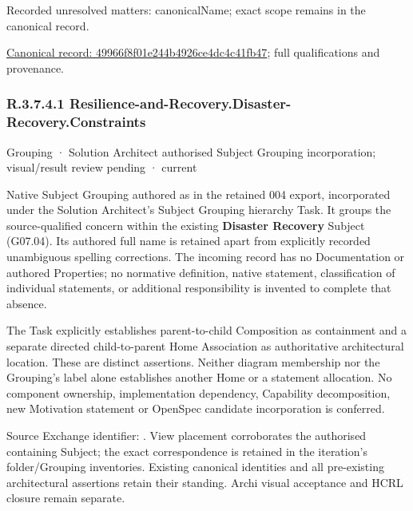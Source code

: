 {\small Recorded unresolved matters: canonicalName; exact scope remains in the canonical record.}\par
{\footnotesize \href{../../../../continuum/grouping/49966f8f01e244b4926ce4dc4c41fb47.md}{Canonical record: 49966f8f01e244b4926ce4dc4c41fb47}; full qualifications and provenance.}\par
\subsubsection*{R.3.7.4.1 Resilience-and-Recovery.Disaster-Recovery.Constraints}
\label{navigation:R.3.7.4.1}

\label{element:f7d9c92661ed44af99516400635041bf}
{\small Grouping · Solution Architect authorised Subject Grouping incorporation; visual/result review pending · current}\par

Native Subject Grouping authored as \texttt{} in the retained 004 export,
incorporated under the Solution Architect's Subject Grouping hierarchy Task.
It groups the source-qualified \texttt{} concern within
the existing \textbf{Disaster Recovery} Subject (G07.04). Its authored full name
is retained apart from explicitly recorded unambiguous spelling corrections.
The incoming record has no Documentation or authored Properties; no normative
definition, native statement, classification of individual statements, or
additional responsibility is invented to complete that absence.



The Task explicitly establishes parent-to-child Composition as containment and
a separate directed child-to-parent Home Association as authoritative architectural
location. These are distinct assertions. Neither diagram membership nor the
Grouping's label alone establishes another Home or a statement allocation.
No component ownership, implementation dependency, Capability decomposition,
new Motivation statement or OpenSpec candidate incorporation is conferred.



Source Exchange identifier: \texttt{}. View placement corroborates
the authorised containing Subject; the exact correspondence is retained in the
iteration's folder/Grouping inventories. Existing canonical identities and all
pre-existing architectural assertions retain their standing. Archi visual
acceptance and HCRL closure remain separate.


